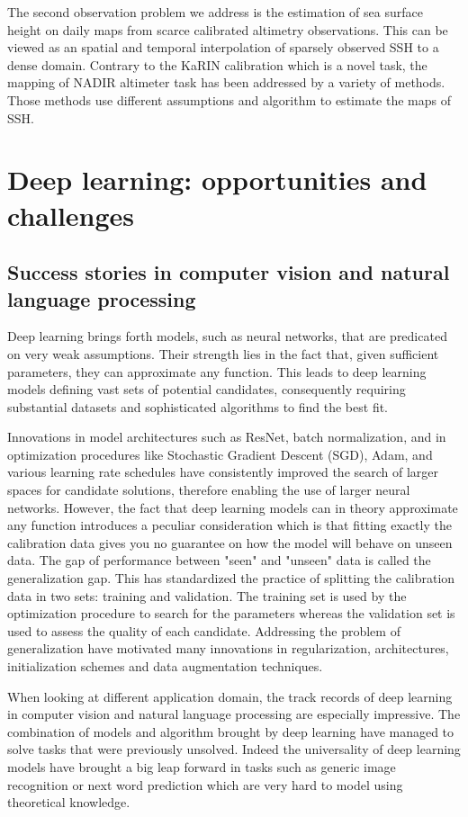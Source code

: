 \begin{bibunit}
The second observation problem we address is the estimation of sea surface height on daily maps from scarce calibrated altimetry observations.
This can be viewed as an spatial and temporal interpolation of sparsely observed SSH to a dense domain.
Contrary to the KaRIN calibration which is a novel task, the mapping of NADIR altimeter task has been addressed by a variety of methods.
Those methods use different assumptions and algorithm to estimate the maps of SSH.


\section{Deep learning: opportunities and challenges}

\subsection{Success stories in computer vision and natural language processing}
Deep learning brings forth models, such as neural networks, that are predicated on very weak assumptions. Their strength lies in the fact that, given sufficient parameters, they can approximate any function\cite{}. This leads to deep learning models defining vast sets of potential candidates, consequently requiring substantial datasets and sophisticated algorithms to find the best fit.

Innovations in model architectures such as ResNet\cite{}, batch normalization\cite{}, and in optimization procedures\cite{} like Stochastic Gradient Descent (SGD)\cite{}, Adam\cite{}, and various learning rate schedules have consistently improved the search of larger spaces for candidate solutions, therefore enabling the use of larger neural networks. 
However, the fact that deep learning models can in theory approximate any function introduces a peculiar consideration which is that fitting exactly the calibration data gives you no guarantee on how the model will behave on unseen data.
The gap of performance between "seen" and "unseen" data is called the generalization gap.
This has standardized the practice of splitting the calibration data in two sets: training and validation.
The training set is used by the optimization procedure to search for the parameters whereas the validation set is used to assess the quality of each candidate. 
Addressing the problem of generalization have motivated many innovations in regularization, architectures, initialization schemes and data augmentation techniques.


When looking at different application domain, the track records of deep learning in computer vision\cite{} and natural language processing\cite{} are especially impressive. 
The combination of models and algorithm brought by deep learning have managed to solve tasks that were previously unsolved.
Indeed the universality of deep learning models have brought a big leap forward in tasks such as generic image recognition or next word prediction which are very hard to model using theoretical knowledge.


\end{bibunit}
